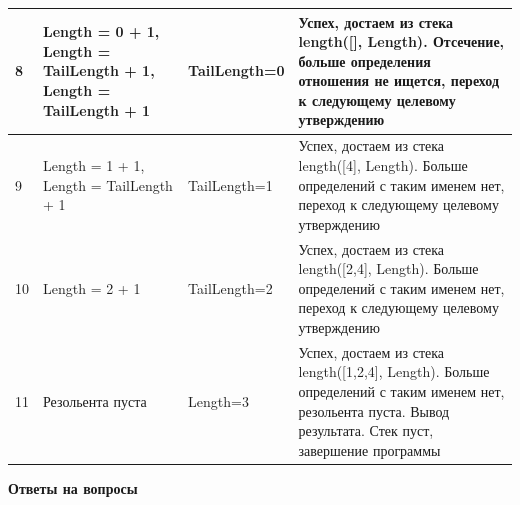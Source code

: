 \documentclass[a4paper,14pt]{extreport} %
\begin{document}
\begin{longtable}{|p{0.5cm}|p{5cm}|p{6cm}|p{5.5cm}|}
	8 & Length = 0 + 1, Length = TailLength + 1, Length = TailLength + 1 & TailLength=0 & Успех, достаем из стека length([], Length).  Отсечение, больше определения отношения не ищется, переход к следующему целевому утверждению \\ \hline
	
	9 & Length = 1 + 1, Length = TailLength + 1 & TailLength=1 & Успех, достаем из стека length([4], Length). Больше определений с таким именем нет, переход к следующему целевому утверждению \\ \hline
	
	10 & Length = 2 + 1 & TailLength=2 & Успех, достаем из стека length([2,4], Length). Больше определений с таким именем нет, переход к следующему целевому утверждению \\ \hline
	
	11 & Резольента пуста & Length=3 & Успех, достаем из стека length([1,2,4], Length). Больше определений с таким именем нет, резольента пуста. Вывод результата. Стек пуст, завершение программы \\ \hline
	
\end{longtable}

\hfill

\textbf{Ответы на вопросы}
\end{document}
